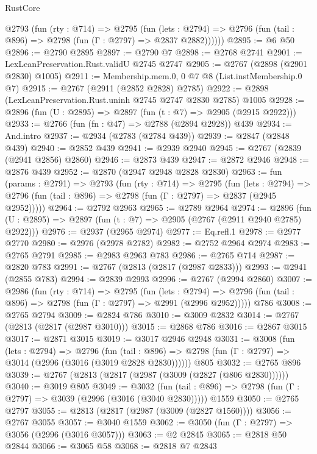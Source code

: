 \begin{lexlean}{RustCore}
\begin{coremodule}
      @2793
        (fun (rty : @714) =>
        @2795
          (fun (lets : @2794) =>
          @2796 (fun (tail : @896) => @2798 (fun (Γ : @2797) => @2837 @2882))))))
@2895 := @6 @50
@2896 := @2790 @2895
@2897 := @2790 @7
@2898 := @2768 @2741
@2901 := LexLeanPreservation.Rust.validU @2745 @2747
@2905 := @2767 (@2898 (@2901 @2830) @1005)
@2911 := Membership.mem.{0, 0} @7 @8 (List.instMembership.{0} @7)
@2915 := @2767 (@2911 (@2852 @2828) @2785)
@2922 := @2898 (LexLeanPreservation.Rust.uninh @2745 @2747 @2830 @2785) @1005
@2928 := @2896 (fun (U : @2895) => @2897 (fun (t : @7) => @2905 (@2915 @2922)))
@2933 := @2766 (fun (fn : @47) => @2788 (@2894 @2928)) @439
@2934 := And.intro
@2937 := @2934 (@2783 (@2784 @439))
@2939 := @2847 (@2848 @439)
@2940 := @2852 @439
@2941 := @2939 @2940
@2945 := @2767 (@2839 (@2941 @2856) @2860)
@2946 := @2873 @439
@2947 := @2872 @2946
@2948 := @2876 @439
@2952 := @2870 (@2947 @2948 @2828 @2830)
@2963 := fun (params : @2791) =>
  @2793
    (fun (rty : @714) =>
    @2795
      (fun (lets : @2794) =>
      @2796 (fun (tail : @896) => @2798 (fun (Γ : @2797) => @2837 (@2945 @2952)))))
@2964 := @2792 @2963
@2965 := @2789 @2964
@2974 := @2896 (fun (U : @2895) => @2897 (fun (t : @7) => @2905 (@2767 (@2911 @2940 @2785) @2922)))
@2976 := @2937 (@2965 @2974)
@2977 := Eq.refl.{1}
@2978 := @2977 @2770
@2980 := @2976 (@2978 @2782)
@2982 := @2752 @2964 @2974
@2983 := @2765 @2791
@2985 := @2983 @2963 @783
@2986 := @2765 @714
@2987 := @2820 @783
@2991 := @2767 (@2813 (@2817 (@2987 @2833)))
@2993 := @2941 (@2855 @783)
@2994 := @2839 @2993
@2996 := @2767 (@2994 @2860)
@3007 := @2986
    (fun (rty : @714) =>
    @2795
      (fun (lets : @2794) =>
      @2796 (fun (tail : @896) => @2798 (fun (Γ : @2797) => @2991 (@2996 @2952)))))
    @786
@3008 := @2765 @2794
@3009 := @2824 @786
@3010 := @3009 @2832
@3014 := @2767 (@2813 (@2817 (@2987 @3010)))
@3015 := @2868 @786
@3016 := @2867 @3015
@3017 := @2871 @3015
@3019 := @3017 @2946 @2948
@3031 := @3008
    (fun (lets : @2794) =>
    @2796
      (fun (tail : @896) => @2798 (fun (Γ : @2797) => @3014 (@2996 (@3016 (@3019 @2828 @2830))))))
    @805
@3032 := @2765 @896
@3039 := @2767 (@2813 (@2817 (@2987 (@3009 (@2827 (@806 @2830))))))
@3040 := @3019 @805
@3049 := @3032
    (fun (tail : @896) => @2798 (fun (Γ : @2797) => @3039 (@2996 (@3016 (@3040 @2830)))))
    @1559
@3050 := @2765 @2797
@3055 := @2813 (@2817 (@2987 (@3009 (@2827 @1560))))
@3056 := @2767 @3055
@3057 := @3040 @1559
@3062 := @3050 (fun (Γ : @2797) => @3056 (@2996 (@3016 @3057)))
@3063 := @2 @2845
@3065 := @2818 @50 @2844
@3066 := @3065 @58
@3068 := @2818 @7 @2843

\end{coremodule}
\end{lexlean}
